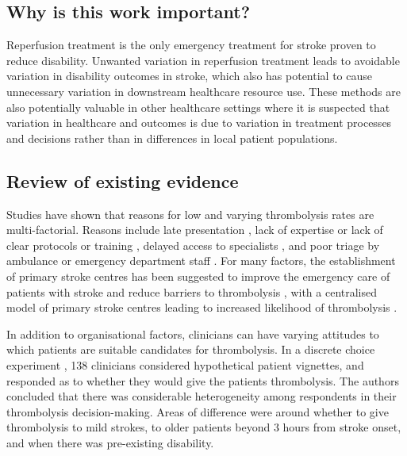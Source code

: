 \subsection{Why is this work important?}

Reperfusion treatment is the only emergency treatment for stroke proven to reduce disability. Unwanted variation in reperfusion treatment leads to avoidable variation in disability outcomes in stroke, which also has potential to cause unnecessary variation in downstream healthcare resource use. These methods are also potentially valuable in other healthcare settings where it is suspected that variation in healthcare and outcomes is due to variation in treatment processes and decisions rather than in differences in local patient populations.

\subsection{Review of existing evidence}

Studies have shown that reasons for low and varying thrombolysis rates are multi-factorial. Reasons include late presentation \cite{aguiar_de_sousa_access_2019}, lack of expertise \cite{aguiar_de_sousa_access_2019} or lack of clear protocols or training \cite{carter-jones_stroke_2011}, delayed access to specialists \cite{kamal_delays_2017}, and poor triage by ambulance or emergency department staff \cite{carter-jones_stroke_2011}. For many factors, the establishment of primary stroke centres has been suggested to improve the emergency care of patients with stroke and reduce barriers to thrombolysis \cite{carter-jones_stroke_2011}, with a centralised model of primary stroke centres leading to increased likelihood of thrombolysis \cite{lahr_proportion_2012, morris_impact_2014, hunter_impact_2013}. 

In addition to organisational factors, clinicians can have varying attitudes to which patients are suitable candidates for thrombolysis. In a discrete choice experiment \cite{de_brun_factors_2018}, 138 clinicians considered hypothetical patient vignettes, and responded as to whether they would give the patients thrombolysis. The authors concluded that there was considerable heterogeneity among respondents in their thrombolysis decision-making. Areas of difference were around whether to give thrombolysis to mild strokes, to older patients beyond 3 hours from stroke onset, and when there was pre-existing disability.

